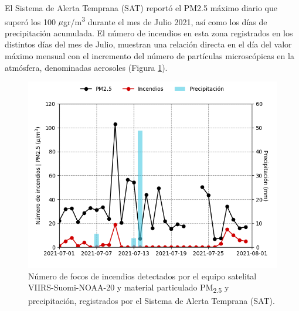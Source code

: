 El Sistema de Alerta Temprana (SAT) reportó el PM2.5 máximo diario que superó los 100 $\mu$gr/m\textsuperscript{3} durante el mes de Julio 2021, así como los días de precipitación acumulada. El número de incendios en esta zona registrados en los distintos días del mes de Julio, muestran una relación directa en el día del valor máximo mensual con el incremento del número de partículas microscópicas en la atmósfera, denominadas aerosoles (Figura \ref{fig:incendios}).

\begin{figure}[H]
    \centering
    \includegraphics[width=0.4\paperwidth]{images/image1.png}
    \caption{Número de focos de incendios detectados por el equipo satelital VIIRS-Suomi-NOAA-20 y material particulado PM\textsubscript{2.5} y precipitación, registrados por el Sistema de Alerta Temprana (SAT).}
    \label{fig:incendios}
\end{figure}

